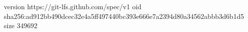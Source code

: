 version https://git-lfs.github.com/spec/v1
oid sha256:ad912bb490dcec32e4a5ff497440bc393e666e7a2394d80a34562abbb3d6b1d5
size 349692

